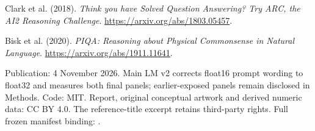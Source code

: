 Clark et al. (2018). \emph{Think you have Solved Question Answering? Try ARC, the AI2 Reasoning Challenge}. \url{https://arxiv.org/abs/1803.05457}.

Bisk et al. (2020). \emph{PIQA: Reasoning about Physical Commonsense in Natural Language}. \url{https://arxiv.org/abs/1911.11641}.

Publication: 4 November 2026. Main LM v2 corrects float16 prompt wording to float32 and measures both final panels; earlier-exposed panels remain disclosed in Methods. Code: MIT. Report, original conceptual artwork and derived numeric data: CC BY 4.0. The reference-title excerpt retains third-party rights. Full frozen manifest binding: \texttt{}.
